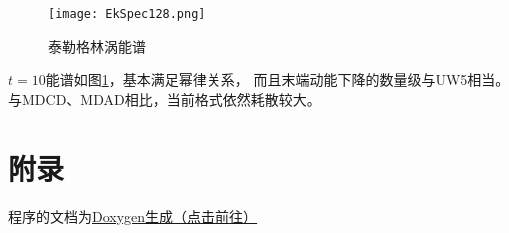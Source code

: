 \documentclass[UTF8,zihao=5]{ctexart} %
\begin{document}
\begin{figure}[htbp]
    \centering
    \texttt{[image: EkSpec128.png]}  %
    \caption{泰勒格林涡能谱}
    \label{fig:EkSpec128}
\end{figure}

$t=10$能谱如图\ref{fig:EkSpec128}，基本满足幂律关系，
而且末端动能下降的数量级与UW5相当。
与MDCD、MDAD相比，当前格式依然耗散较大。







\newpage

\section*{附录}


程序的文档为\href{../../build/docs/html/index.html}{Doxygen生成（点击前往）}

{}



























\end{document}
